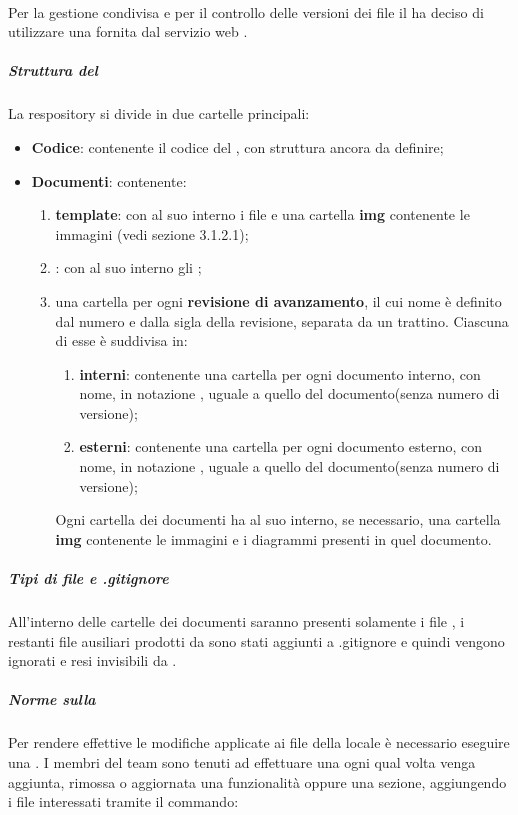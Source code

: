 	\paragraph{}
	Per la gestione condivisa e per il controllo delle versioni dei file il  ha deciso di utilizzare una  fornita dal servizio web .
		\subparagraph{Struttura del }
		La respository si divide in due cartelle principali:
		\begin{itemize}
			\item \textbf{Codice}: contenente il codice del , con struttura ancora da definire;
			\item \textbf{Documenti}: contenente:
			\begin{enumerate}
				\item \textbf{template}: con al suo interno i file  e una cartella \textbf{img} contenente le immagini (vedi sezione 3.1.2.1);
				\item \textbf{}: con al suo interno gli ;
				\item una cartella per ogni \textbf{revisione di avanzamento}, il cui nome è definito dal numero e dalla sigla della revisione, separata da un trattino. Ciascuna di esse è suddivisa in:
				\begin{enumerate}
					\item \textbf{interni}: contenente una cartella per ogni documento interno, con nome, in notazione , uguale a quello del documento(senza numero di versione);
					\item \textbf{esterni}: contenente una cartella per ogni documento esterno, con nome, in notazione , uguale a quello del documento(senza numero di versione);
				\end{enumerate}
				Ogni cartella dei documenti ha al suo interno, se necessario, una cartella \textbf{img} contenente le immagini e i diagrammi presenti in quel documento.
			\end{enumerate}
		\end{itemize}
		\subparagraph{Tipi di file e .gitignore}
		All'interno delle cartelle dei documenti saranno presenti solamente i file , i restanti file ausiliari prodotti da \gl{\LaTeX} sono stati aggiunti a .gitignore e quindi vengono ignorati e resi invisibili da .
		\subparagraph{Norme sulla }
		Per rendere effettive le modifiche applicate ai file della  locale è necessario eseguire una \textbf{}.
		I membri del team sono tenuti ad effettuare una  ogni qual volta venga aggiunta, rimossa o aggiornata una funzionalità oppure una sezione, aggiungendo i file interessati tramite il commando:
